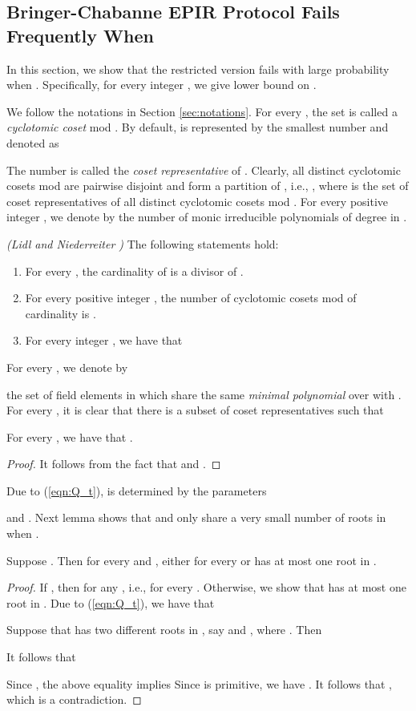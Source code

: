 \documentclass[JMC]{degruyter-journal}
\begin{document}
\subsection{Bringer-Chabanne EPIR Protocol Fails Frequently When }\label{sec:BC_EPIR_fails_frequently_for_g}

In this section, we show that the restricted version  fails with large
probability when . Specifically, for every integer , we give lower bound on .

We follow the notations in Section \ref{sec:notations}. For every
, the set   is called a {\em cyclotomic coset} mod .   By
default,   is  represented by the smallest  number  and denoted as

The number  is called the {\em coset representative} of . Clearly, all distinct cyclotomic cosets mod  are pairwise
disjoint and form a partition of , i.e.,
, where  is the set of
coset representatives of all distinct cyclotomic cosets mod . For
every positive integer , we denote by  the  number of
monic irreducible polynomials of degree  in .
\begin{lemma}\label{lem:cyc}
{\em  (Lidl and Niederreiter \cite{LN97})}
The following statements hold:
\begin{enumerate}
\item For every , the cardinality of  is a divisor of
.
\item For every positive integer , the number of cyclotomic cosets
mod  of cardinality  is .
\item  For  every integer , we have that

\end{enumerate}
\end{lemma}
For every , we denote by

 the set of field elements  in  which share the same {\em minimal polynomial} over  with  .
For every , it is clear that there  is  a subset
 of coset representatives such that

\begin{lemma}\label{lem:Unotempty}
 For every  ,  we have that .
\end{lemma}


\begin{proof}
It follows from the fact that  and .
\end{proof}

Due to (\ref{eqn:Q_t}),  is  determined by the parameters

and . Next lemma shows that  and  only share a
very
 small number of roots in 
when .
\begin{lemma}\label{lem:rootQ}
Suppose  . Then for every  and , either  for every  or  has at most one root in .
\end{lemma}
\begin{proof}
If , then  for any
, i.e.,
  for every . Otherwise, we show that  has at most one root in
 .
Due to  (\ref{eqn:Q_t}), we have that

 Suppose that  has two different roots in  , say  and , where
 . Then

It follows that

Since , the above equality implies
  Since
 is primitive, we have . It follows that
 , which is a
contradiction.
\end{proof}
\end{document}
